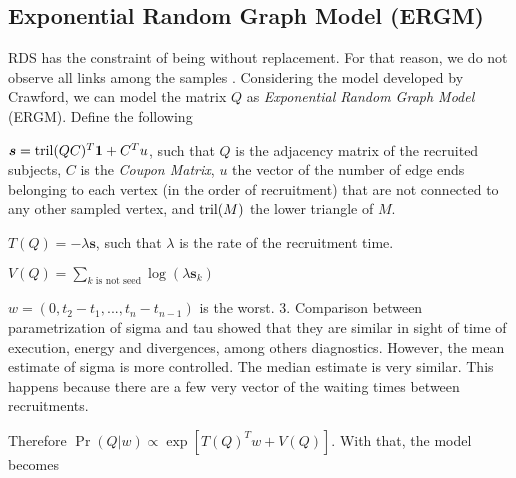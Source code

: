 \subsection{Exponential Random Graph Model (ERGM)}

RDS has the constraint of being without replacement. For that reason, we do
not observe all links among the samples \cite[]{crawford2016}. Considering the
model developed by Crawford, we can model the
matrix $Q$ as {\em Exponential Random Graph Model} (ERGM). Define the
following 

\begin{alineas}
  \item $\boldsymbol{s} = \operatorname{tril}(QC)^T \boldsymbol{1} + C^Tu$, such that $Q$ is the
  adjacency matrix of the recruited subjects, $C$ is the {\em Coupon Matrix},
  $u$ the vector of the number of edge ends belonging to each vertex
  (in the order of recruitment) that are not connected to any other sampled
  vertex, and $\operatorname{tril}(M)$ the lower triangle of $M$. 

  \item $T(Q) = -\lambda \boldsymbol{s}$, such that $\lambda$ is the rate of
  the recruitment time. 

  \item $V(Q) = \sum_{k \text{ is not seed}} \log(\lambda \boldsymbol{s}_k)$
  
  \item $w = (0, t_2 - t_1, ..., t_n - t_{n-1})$ is the worst.
  3. Comparison between parametrization of sigma and tau showed that they are
  similar in sight of time of execution, energy and divergences, among others
  diagnostics. However, the mean estimate of sigma is more controlled. The
  median estimate is very similar. This happens because there are a few very
   vector of the waiting times between
  recruitments.  
\end{alineas}

Therefore $\Pr(Q|w) \propto \exp[T(Q)^Tw + V(Q)]$. With that, the model
becomes 

